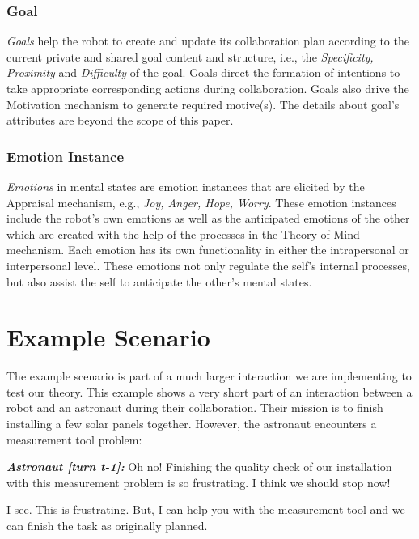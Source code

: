 \documentclass{article}
\begin{document}
\subsubsection{Goal}

\textit{Goals} help the robot to create and update its collaboration plan
according to the current private and shared goal content and structure, i.e.,
the \textit{Specificity, Proximity} and \textit{Difficulty} of the goal. Goals
direct the formation of intentions to take appropriate corresponding actions
during collaboration. Goals also drive the Motivation mechanism to generate
required motive(s). The details about goal's attributes are beyond the scope of
this paper.

\subsubsection{Emotion Instance}

\textit{Emotions} in mental states are emotion instances that are elicited by
the Appraisal mechanism, e.g., \textit{Joy, Anger, Hope, Worry}. These emotion
instances include the robot's own emotions as well as the anticipated emotions
of the other which are created with the help of the processes in the Theory of
Mind mechanism. Each emotion has its own functionality in either the
intrapersonal or interpersonal level. These emotions not only regulate the
self's internal processes, but also assist the self to anticipate the other's
mental states.

\section{Example Scenario}

The example scenario is part of a much larger interaction we are implementing to
test our theory. This example shows a very short part of an interaction between
a robot and an astronaut during their collaboration. Their mission is to finish
installing a few solar panels together. However, the astronaut encounters a
measurement tool problem:

\begin{description}
  \item \textit{\textbf{\fontsize{9pt}{12pt}\selectfont Astronaut [turn t-1]:}}
  Oh no! Finishing the quality check of our installation with this measurement
  problem is so frustrating. I think we should stop now!

  \item \textit{\textbf{\fontsize{9pt}{12pt}\selectfont{Robot [turn t]:}}}
  I see. This is frustrating. But, I can help you with the measurement tool and
  we can finish the task as originally planned.
\end{description}
\end{document}
